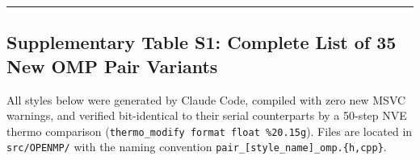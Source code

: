 \documentclass[
  11pt,
]{article}
\begin{document}
\begin{center}\rule{0.5\linewidth}{0.5pt}\end{center}

\subsection{Supplementary Table S1: Complete List of 35 New OMP Pair
Variants}\label{supplementary-table-s1-complete-list-of-35-new-omp-pair-variants}

All styles below were generated by Claude Code, compiled with zero new
MSVC warnings, and verified bit-identical to their serial counterparts
by a 50-step NVE thermo comparison
(\texttt{thermo\_modify\ format\ float\ \%20.15g}). Files are located in
\texttt{src/OPENMP/} with the naming convention
\texttt{pair\_{[}style\_name{]}\_omp.\{h,cpp\}}.
\end{document}
